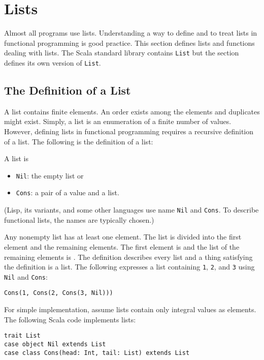 \section{Lists}

Almost all programs use lists. Understanding a way to define and to treat lists
in functional programming is good practice. This section defines lists and
functions dealing with lists. The Scala standard library contains \verb!List! but
the section defines its own version of \verb!List!.

\subsection{The Definition of a List}

A list contains finite elements. An order exists among the elements and
duplicates might exist. Simply, a list is an enumeration of a finite number of
values. However, defining lists in functional programming requires a recursive
definition of a list. The following is the definition of a list:

A list is

\begin{itemize}
\item \verb!Nil!: the empty list or
\item \verb!Cons!: a pair of a value and a list.
\end{itemize}

(Lisp, its variants, and some other languages use name \verb!Nil! and
\verb!Cons!. To describe functional lists, the names are typically chosen.)

Any nonempty list has at least one element. The list is divided into the first
element and the remaining elements. The first element is  and the list
of the remaining elements is . The definition describes every list and
a thing satisfying the definition is a list. The following expresses a list
containing \verb!1!, \verb!2!, and \verb!3! using \verb!Nil! and \verb!Cons!:

\begin{verbatim}
Cons(1, Cons(2, Cons(3, Nil)))
\end{verbatim}

For simple implementation, assume lists contain only integral values as elements.
The following Scala code implements lists:

\begin{verbatim}
trait List
case object Nil extends List
case class Cons(head: Int, tail: List) extends List
\end{verbatim}


